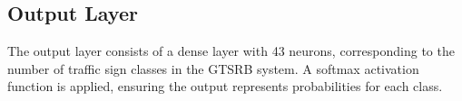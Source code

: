 \documentclass{article} %
\begin{document}


\subsection{Output Layer}
The output layer consists of a dense layer with 43 neurons, corresponding to the number of traffic sign classes in the GTSRB system. A softmax activation function is applied, ensuring the output represents probabilities for each class.
\end{document}
